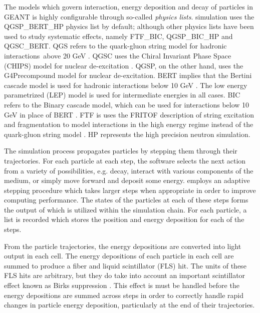 The models which govern interaction, energy deposition and decay of particles in GEANT is highly configurable through so-called \textit{physics lists}.  \nova simulation uses the QGSP\_BERT\_HP physics list by default; although other physics lists have been used to study systematic effects, namely FTF\_BIC, QGSP\_BIC\_HP and QGSC\_BERT.  QGS refers to the quark-gluon string model for hadronic interactions above 20 GeV \cite{kaidalov1982pomeron}.  QGSC uses the Chiral Invariant Phase Space (CHIPS) model for nuclear de-excitation \cite{kossov2002chiral}.  QGSP, on the other hand, uses the G4Precompound model for nuclear de-excitation.  BERT implies that the Bertini cascade model is used for hadronic interactions below 10 GeV \cite{bertini1971news,guthrie1968calculation}.  The low energy parametrized (LEP) model is used for intermediate energies in all cases.  BIC refers to the Binary cascade model, which can be used for interactions below 10 GeV in place of BERT \cite{folger2004binary}.  FTF is uses the FRITOF description of string excitation and fragmentation to model interactions in the high energy regime instead of the quark-gluon string model \cite{andersson1993fritiof}.  HP represents the \geant high precision neutron simulation.

The \geant simulation process propagates particles by stepping them through their trajectories.  For each particle at each step, the software selects the next action from a variety of possibilities, e.g. decay, interact with various components of the medium, or simply move forward and deposit some energy.  \geant employs an adaptive stepping procedure which takes larger steps when appropriate in order to improve computing performance.  The states of the particles at each of these steps forms the output of \geant which is utilized within the \nova simulation chain.  For each particle, a list is recorded which stores the position and energy deposition for each of the steps.

From the \geant particle trajectories, the energy depositions are converted into light output in each cell.  The energy depositions of each particle in each cell are summed to produce a fiber and liquid scintillator (FLS) hit.  The units of these FLS hits are arbitrary, but they do take into account an important scintillator effect known as Birks suppression \cite{birks1951scintillations}.  This effect is must be handled before the energy depositions are summed across steps in order to correctly handle rapid changes in particle energy deposition, particularly at the end of their trajectories.

